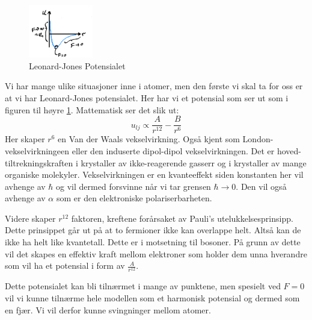 \documentclass{article}
\begin{document}
\nyside
{}
\begin{figure}
    \centering
    \includegraphics[width=0.25\textwidth]{bilder/leonard_jones_potensialet.png}
    \caption{Leonard-Jones Potensialet}
    \label{fig:leonard_jones_potensialet}
\end{figure}
Vi har mange ulike situasjoner inne i atomer, men den første vi skal ta for oss er at vi har Leonard-Jones potensialet. Her har vi et potensial som ser ut som i figuren til høyre \ref{fig:leonard_jones_potensialet}. Mattematisk ser det slik ut:
\begin{equation}
    \label{eq:leonard_jones_potensialet}
    u_{lj} \propto \frac{A}{r^{12}} - \frac{B}{r^6}
\end{equation}
Her skaper $r^6$ en Van der Waals vekselvirkning. Også kjent som London-vekselvirkningeen eller den induserte dipol-dipol vekselvirkningen. Det er hoved-tiltrekningskraften i krystaller av ikke-reagerende gasserr og i krystaller av mange organiske molekyler. Vekselvirkningen er en kvanteeffekt siden konstanten her vil avhenge av $\hbar$ og vil dermed forsvinne når vi tar grensen $\hbar \rightarrow 0$. Den vil også avhenge av $\alpha$ som er den elektroniske polariserbarheten.

Videre skaper $r^{12}$ faktoren, kreftene forårsaket av Pauli's utelukkelsesprinsipp. Dette prinsippet går ut på at to fermioner ikke kan overlappe helt. Altså kan de ikke ha helt like kvantetall. Dette er i motsetning til bosoner. På grunn av dette vil det skapes en effektiv kraft mellom elektroner som holder dem unna hverandre som vil ha et potensial i form av $\frac{A}{r^{12}}$.

Dette potensialet kan bli tilnærmet i mange av punktene, men spesielt ved $F = 0$ vil vi kunne tilnærme hele modellen som et harmonisk potensial og dermed som en fjær. Vi vil derfor kunne svingninger mellom atomer.
\end{document}
